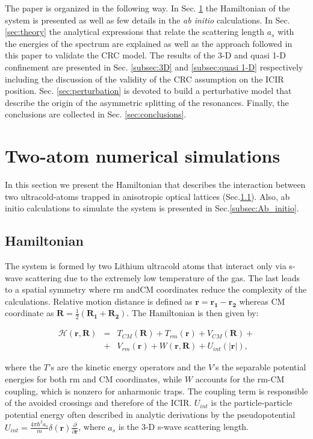 \documentclass[aps,pre,twocolumn,superscriptaddress,showpacs]{revtex4-1}
\newcommand{\abinitio}{\textit{ab initio }}
\newcommand{\bfeq}[1]{{\boldsymbol{#1}}}
\begin{document}
The paper is organized in the following way. In Sec. \ref{sec:system} the Hamiltonian of the system is presented as well as few details in the \abinitio calculations. In Sec. \ref{sec:theory} the analytical expressions that relate the scattering length $a_s$ with the energies of the spectrum are explained as well as the approach followed in this paper to validate the CRC model. The results of the 3-D and quasi 1-D confinement are presented in Sec. \ref{subsec:3D} and \ref{subsec:quasi 1-D} respectively including the discussion of the validity of the CRC assumption on the ICIR position. Sec. \ref{sec:perturbation} is devoted to build a perturbative model that describe the origin of the asymmetric splitting of the resonances. Finally, the conclusions are collected in Sec. \ref{sec:conclusions}.
 
 
\section{Two-atom numerical simulations}  \label{sec:system}
In this section we present the Hamiltonian that describes the interaction between two ultracold-atoms trapped in anisotropic optical lattices (Sec.\ref{subsec:H}). Also, ab initio calculations to 
simulate the system is presented in Sec.\ref{subsec:Ab_initio}.

\subsection{Hamiltonian} \label{subsec:H}
The system is formed by two Lithium ultracold atoms that interact only via s-wave scattering due to the extremely low temperature of the gas. The last leads to a spatial symmetry where
rm andCM coordinates reduce the complexity of the calculations. Relative motion distance is defined as $\bfeq{r} = \bfeq{r_1} - \bfeq{r_2}$ whereas CM coordinate as 
$\bfeq{R} = \frac{1}{2}(\bfeq{R_1} + \bfeq{R_2})$. The Hamiltonian is then given by:
		
\begin{eqnarray}
\mathcal{H}(\bfeq{r}, \bfeq{R}) &=& T_{CM}(\bfeq{R}) + T_{rm}(\bfeq{r}) + V_{CM}(\bfeq{R}) +  \nonumber \\ 
&+& V_{rm}(\bfeq{r}) + W(\bfeq{r}, \bfeq{R}) + U_{int}(|\bfeq{r}|), 
 \label{eq:Hamiltonian}
\end{eqnarray}
		
where the $T$'s are the kinetic energy operators and the $V$'s the separable potential energies for both rm and CM coordinates, while $W$ accounts for the rm-CM coupling, which is 
nonzero for anharmonic traps. The coupling term is responsible of 	the avoided crossings and therefore of the ICIR. $U_{int}$ is the particle-particle potential energy often 
described in analytic derivations by the pseudopotential $U_{int} = \frac{4\pi \hbar^2 a_s}{m} \delta(\bfeq{r})\frac{\partial}{\partial \bfeq{r}}$, where $a_s$ is the 3-D s-wave scattering length.
		
\end{document}
